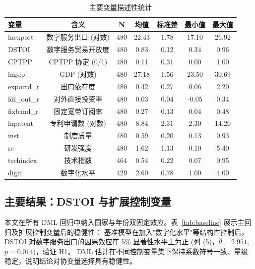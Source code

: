 \documentclass[11pt,a4paper]{article}
\begin{document}
\begin{table}[H]
\centering\small
\caption{主要变量描述性统计}\label{tab:desc}
\begin{tabular}{lcccccc}
\toprule
变量 & 含义 & N & 均值 & 标准差 & 最小值 & 最大值 \\
\midrule
lnexport       & 数字服务出口 (对数)     & 480 & 22.43 & 1.78 & 17.10 & 26.92 \\
DSTOI          & 数字服务贸易开放度     & 480 & 0.83  & 0.12 & 0.34  & 0.96  \\
CPTPP          & CPTPP 协定 (0/1)      & 480 & 0.11  & 0.31 & 0.00  & 1.00  \\
lngdp          & GDP (对数)            & 480 & 27.18 & 1.56 & 23.50 & 30.69 \\
exportd\_r     & 出口依存度            & 480 & 0.42  & 0.27 & 0.06  & 2.20  \\
fdi\_out\_r    & 对外直接投资率        & 480 & 0.03  & 0.04 & -0.05 & 0.34  \\
fixband\_r     & 固定宽带订阅率        & 480 & 0.27  & 0.13 & 0.04  & 0.48  \\
lnpatent       & 专利申请数 (对数)     & 480 & 8.84  & 2.31 & 2.30  & 14.20 \\
inst           & 制度质量              & 480 & 0.59  & 0.20 & 0.13  & 0.93  \\
re             & 研发强度              & 480 & 1.62  & 1.13 & 0.10  & 5.40  \\
techindex      & 技术指数              & 464 & 0.54  & 0.22 & 0.07  & 0.95  \\
digit          & 数字化水平            & 429 & 2.60  & 0.78 & 1.00  & 4.00  \\
\bottomrule
\end{tabular}
\end{table}

\subsection{主要结果：DSTOI 与扩展控制变量}

本文在所有 DML 回归中纳入国家与年份双固定效应。表~\ref{tab:baseline} 展示主回归及扩展控制变量后的稳健性：
基准模型在加入"数字化水平"等结构性控制后，DSTOI 对数字服务出口的因果效应在 5\% 显著性水平上为正
(列 (5)，$\hat{\theta}=2.951$, $p=0.014$)，验证 H1。
DML 估计在不同控制变量集下保持系数符号一致、量级稳定，说明结论对协变量选择具有稳健性。
\end{document}
